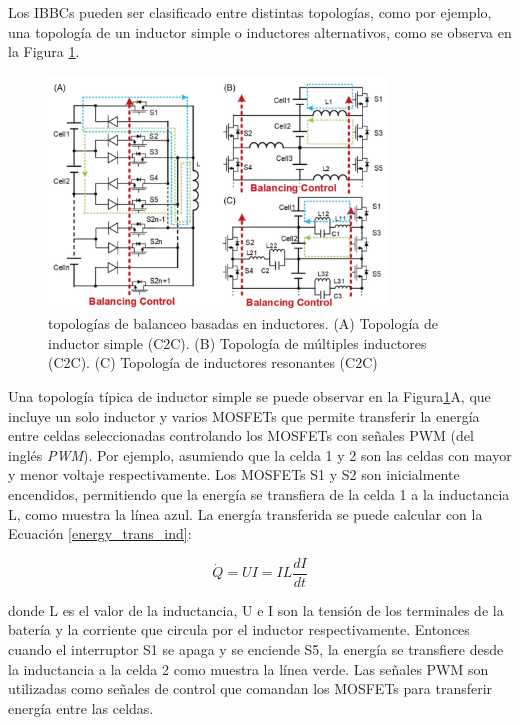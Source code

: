 \documentclass[10pt,a4paper]{article}
\begin{document}
Los \acrshort{IBBC}s pueden ser clasificado entre distintas topolog\'ias, como por
ejemplo, una topolog\'ia de un inductor simple o inductores alternativos, como
se observa en la Figura \ref{ibbc_top}.

\begin{figure}[h!]
    \begin{center}
        \includegraphics[width=0.8\textwidth]{ibbc_top.png}
        \caption{topolog\'ias de balanceo basadas en inductores. (A) Topolog\'ia
        de inductor simple (\acrshort{C2C}). (B) Topolog\'ia de m\'ultiples
        inductores (\acrshort{C2C}). (C) Topolog\'ia de inductores resonantes
        (\acrshort{C2C})}
        \label{ibbc_top}
    \end{center}
\end{figure}

Una topolog\'ia t\'ipica de inductor simple se puede observar en la
Figura\ref{ibbc_top}A, que incluye un solo inductor y varios MOSFETs que permite
transferir la energ\'ia entre celdas seleccionadas controlando los MOSFETs con
señales \acrshort{PWM} (del ingl\'es \emph{\acrlong{PWM}}). Por ejemplo, 
asumiendo que la celda 1 y 2 son las celdas con mayor y menor voltaje 
respectivamente. Los MOSFETs S1 y S2 son inicialmente encendidos, permitiendo 
que la energ\'ia se transfiera de la celda 1 a la inductancia L, como muestra la 
línea azul. La energ\'ia transferida se puede calcular con la Ecuaci\'on 
\ref{energy_trans_ind}:

\begin{equation}
    \dot{Q} = UI = IL\frac{dI}{dt} \label{energy_trans_ind}
\end{equation}

donde L es el valor de la inductancia, U e I son la tensi\'on de los terminales
de la bater\'ia y la corriente que circula por el inductor respectivamente.
Entonces cuando el interruptor S1 se apaga y se enciende S5, la energ\'ia se
transfiere desde la inductancia a la celda 2 como muestra la línea verde.
Las señales \acrshort{PWM} son utilizadas como señales de control que comandan 
los MOSFETs para transferir energ\'ia entre las celdas.
\end{document}
